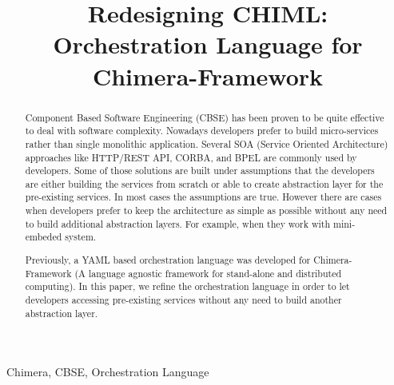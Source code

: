 \documentclass[conference]{IEEEtran}
\begin{document}

\title{Redesigning CHIML: Orchestration Language for Chimera-Framework}

\author{
\and
{}
\and
{}
}


\maketitle


\begin{abstract}
Component Based Software Engineering (CBSE) has been proven to be quite effective to deal with software complexity. Nowadays developers prefer to build micro-services rather than single monolithic application. Several SOA (Service Oriented Architecture) approaches like HTTP/REST API, CORBA, and BPEL are commonly used by developers. Some of those solutions are built under assumptions that the developers are either building the services from scratch or able to create abstraction layer for the pre-existing services. In most cases the assumptions are true. However there are cases when developers prefer to keep the architecture as simple as possible without any need to build additional abstraction layers. For example, when they work with mini-embeded system.

Previously, a YAML based orchestration language was developed for Chimera-Framework (A language agnostic framework for stand-alone and distributed computing). In this paper, we refine the orchestration language in order to let developers accessing pre-existing services without any need to build another abstraction layer.
\end{abstract}

\begin{IEEEkeywords}
Chimera, CBSE, Orchestration Language
\end{IEEEkeywords}
\end{document}
